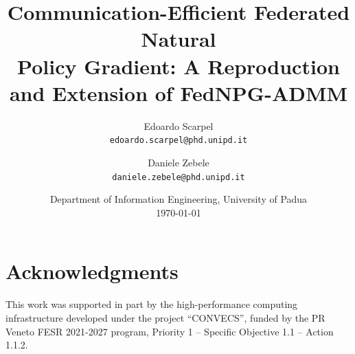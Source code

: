 \documentclass[11pt,a4paper]{article}
\title{\textbf{Communication-Efficient Federated Natural \\
Policy Gradient: A Reproduction \\
and Extension of FedNPG-ADMM}}
\author{
  Edoardo Scarpel \\
  \texttt{edoardo.scarpel@phd.unipd.it}
  \and
  Daniele Zebele \\
  \texttt{daniele.zebele@phd.unipd.it}
}
\date{Department of Information Engineering, University of Padua \\[2pt] \today}
\begin{document}
\maketitle

\begin{abstract}

\end{abstract}











\section*{Acknowledgments}
This work was supported in part by the high-performance computing infrastructure
developed under the project ``CONVECS'', funded by the PR Veneto FESR 2021-2027
program, Priority 1 -- Specific Objective 1.1 -- Action 1.1.2.




\appendix

\end{document}
